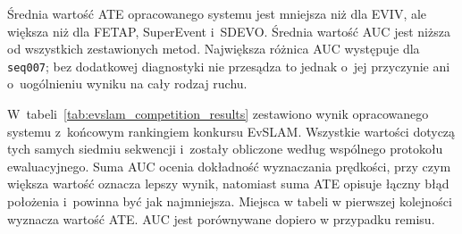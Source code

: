\begin{table}[!ht]
    \centering
    \scriptsize
    \caption{Porównanie ATE RMSE [m] / AUC na podstawie tabeli VII publikacji~\cite{zhong2026evslam}.}
    \label{tab:evslam_sota_comparison}
\end{table}

Średnia wartość ATE opracowanego systemu jest mniejsza niż dla EVIV, ale większa niż dla FETAP, SuperEvent i~SDEVO. Średnia wartość AUC jest niższa od wszystkich zestawionych metod. Największa różnica AUC występuje dla \texttt{seq007}; bez dodatkowej diagnostyki nie przesądza to jednak o~jej przyczynie ani o~uogólnieniu wyniku na cały rodzaj ruchu.

W~tabeli~\ref{tab:evslam_competition_results} zestawiono wynik opracowanego systemu z~końcowym rankingiem konkursu EvSLAM. Wszystkie wartości dotyczą tych samych siedmiu sekwencji i~zostały obliczone według wspólnego protokołu ewaluacyjnego. Suma AUC ocenia dokładność wyznaczania prędkości, przy czym większa wartość oznacza lepszy wynik, natomiast suma ATE opisuje łączny błąd położenia i~powinna być jak najmniejsza. Miejsca w tabeli w pierwszej kolejności wyznacza wartość ATE. AUC jest porównywane dopiero w przypadku remisu.

